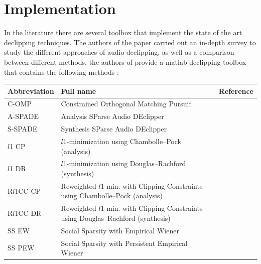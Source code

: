 \documentclass{article}
\numberwithin{dummy}{section}
\begin{document}
\section{Implementation}
In the literature there are several toolbox that implement the state of the art declipping techniques. The authors of the paper \cite{záviška2020survey} carried out an in-depth survey to study the different approaches of audio declipping, as well as a comparison between different methods. the authors of \cite{záviška2020survey} provide a matlab declipping toolbox that contains the following methods : 
\begin{table}[ht!]
\begin{tabular}{|l|l|c|}
\hline
Abbreviation & Full name                                                                       & Reference \\ \hline
\rowcolor{Gray}
            C-OMP & Constrained Orthogonal Matching Pursuit                                         &   \cite{5946407}        \\ \hline
             A-SPADE & Analysis SParse Audio DEclipper                                                &       \cite{DBLP:journals/corr/KiticBG15}    \\ \hline
             \rowcolor{Gray}
             S-SPADE& Synthesis SParse Audio DEclipper                                                &   \cite{8682348}        \\ \hline
             ${l}$1 CP& ${l}$1-minimization using Chambolle–Pock (analysis)                                 &   \cite{záviška2020survey}        \\ \hline
             \rowcolor{Gray}
             ${l}$1 DR& ${l}$1-minimization using Douglas–Rachford (synthesis)                              &         \cite{articlve}  \\ \hline
             R${l}$1CC CP& Reweighted ${l}$1-min. with Clipping Constraints using Chambolle–Pock (analysis)    &    \cite{záviška2020survey}       \\ \hline
             \rowcolor{Gray}
              R${l}$1CC DR& Reweighted ${l}$1-min. with Clipping Constraints using Douglas–Rachford (synthesis) &        \cite{DBLP:journals/corr/abs-1110-5063}   \\ \hline
             SS EW& Social Sparsity with Empirical Wiener                                           &     \cite{gaultier:tel-02148598}      \\ \hline
             \rowcolor{Gray}
             SS PEW& Social Sparsity with Persistent Empirical Wiener                                &    \cite{gaultier:tel-02148598}       \\ \hline

\end{tabular}
\end{table}
\end{document}
